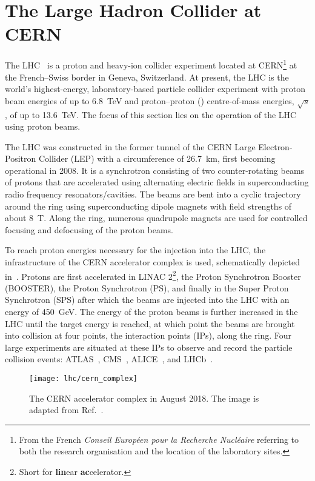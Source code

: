 \section{The Large Hadron Collider at CERN}%
\label{sec:lhc}

The LHC~\cite{Evans:2008zzb} is a proton and heavy-ion collider experiment
located at CERN\footnote{From the French \emph{Conseil Européen pour la
    Recherche Nucléaire} referring to both the research organisation and the
  location of the laboratory sites.} at the French--Swiss border in Geneva,
Switzerland. At present, the LHC is the world's highest-energy, laboratory-based
particle collider experiment with proton beam energies of up to \SI{6.8}{\TeV}
and proton--proton (\pp) centre-of-mass energies, $\sqrt{s}$, of up to
\SI{13.6}{\TeV}. The focus of this section lies on the operation of the LHC
using proton beams.

The LHC was constructed in the former tunnel of the CERN Large Electron-Positron
Collider (LEP) with a circumference of \SI{26.7}{\kilo\metre}, first becoming
operational in 2008. It is a synchrotron consisting of two counter-rotating
beams of protons that are accelerated using alternating electric fields in
superconducting radio frequency resonators/cavities. The beams are bent into a
cyclic trajectory around the ring using superconducting dipole magnets with
field strengths of about \SI{8}{\tesla}. Along the ring, numerous quadrupole
magnets are used for controlled focusing and defocusing of the proton beams.

To reach proton energies necessary for the injection into the LHC, the
infrastructure of the CERN accelerator complex is used, schematically depicted
in~. Protons are first accelerated in LINAC
2\footnote{Short for \textbf{lin}ear \textbf{ac}celerator.}, the Proton
Synchrotron Booster (BOOSTER), the Proton Synchrotron (PS), and finally in the
Super Proton Synchrotron (SPS) after which the beams are injected into the LHC
with an energy of \SI{450}{\GeV}. The energy of the proton beams is further
increased in the LHC until the target energy is reached, at which point the
beams are brought into collision at four points, the interaction points (IPs),
along the ring. Four large experiments are situated at these IPs to observe and
record the particle collision events: ATLAS~\cite{PERF-2007-01},
CMS~\cite{CMS-CMS-00-001}, ALICE~\cite{ALICE:2008ngc}, and
LHCb~\cite{LHCb:2008vvz}.

\begin{figure}[htbp]
  \centering

  \texttt{[image: lhc/cern\_complex]}

  \caption{The CERN accelerator complex in August 2018. The image is adapted
    from Ref.~\cite{Mobs:2684277}.}%
  \label{fig:cern_accelerator_complex}
\end{figure}

